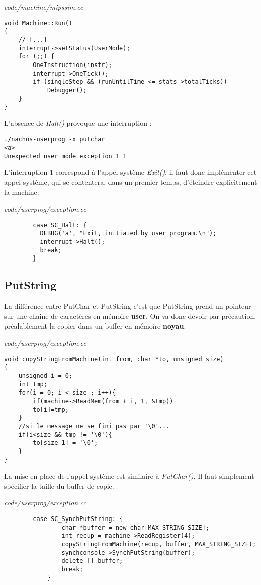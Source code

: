 \documentclass[a4paper,10pt]{article}
\begin{document}
\textit{code/machine/mipssim.cc}
\begin{lstlisting}
void Machine::Run()
{
    // [...]
    interrupt->setStatus(UserMode);
    for (;;) {
        OneInstruction(instr);
        interrupt->OneTick();
        if (singleStep && (runUntilTime <= stats->totalTicks))
            Debugger();
    }
}
\end{lstlisting}

L'absence de \textit{Halt()} provoque une interruption :

\begin{lstlisting}
./nachos-userprog -x putchar
<a>
Unexpected user mode exception 1 1
\end{lstlisting}

L'interruption 1 correspond à l'appel système \textit{Exit()}, il faut
donc implémenter cet appel système, qui se contentera, dans un premier temps,
d'éteindre explicitement la machine:

\textit{code/userprog/exception.cc}
\begin{lstlisting}
        case SC_Halt: {
          DEBUG('a', "Exit, initiated by user program.\n");
          interrupt->Halt();
          break;
        }
\end{lstlisting}

\subsection{PutString}
La différence entre PutChar et PutString c'est que PutString prend un pointeur
sur une chaine de caractères en mémoire \textbf{user}. On va donc devoir par
précaution, préalablement la copier dans un buffer en mémoire \textbf{noyau}.

\textit{code/userprog/exception.cc}
\begin{lstlisting}
void copyStringFromMachine(int from, char *to, unsigned size)
{
	unsigned i = 0;
	int tmp;
	for(i = 0; i < size ; i++){
		if(machine->ReadMem(from + i, 1, &tmp))
		to[i]=tmp;
	}
	//si le message ne se fini pas par '\0'...
	if(i<size && tmp != '\0'){
	 	to[size-1] = '\0';
	}
}
\end{lstlisting}

La mise en place de l'appel système est similaire à \textit{PutChar()}. Il faut
simplement spécifier la taille du buffer de copie.

\textit{code/userprog/exception.cc}
\begin{lstlisting}
        case SC_SynchPutString: {
				char *buffer = new char[MAX_STRING_SIZE];
				int recup = machine->ReadRegister(4);
       			copyStringFromMachine(recup, buffer, MAX_STRING_SIZE);
				synchconsole->SynchPutString(buffer);
       			delete [] buffer;
				break;
			}
\end{lstlisting}
\end{document}
